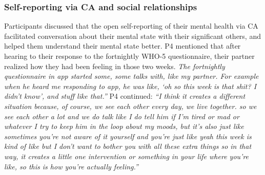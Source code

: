         
        

        
   

            
            
    \subsubsection{Self-reporting via \ac{CA} and social relationships}    
        Participants discussed that the open self-reporting of their mental health via \ac{CA} 
        facilitated conversation about their mental state with their significant others, 
        and helped them understand their mental state better.
        P4 mentioned that after hearing to their response to the fortnightly \ac{WHO-5} questionnaire, their partner realized how they had been feeling in those two weeks.
            \textit{ The fortnightly questionnaire in \acl{app} started some, some talks with, like my partner. For example when he heard me responding to \acl{app}, he was like, `oh so this week is that shit? I didn't know', and stuff like that.''}
        P4 continued:
            \textit{``I think it creates a different situation because, of course, we see each other every day, we live together. 
            so we see each other a lot and we do talk like I do tell him if I'm tired or mad or whatever I try to keep him in the loop about my moods, but it's also just like sometimes you're not aware of it yourself and you're just like yeah this week is kind of like but I don't want to bother you with all these extra things so in that way, it creates a little one intervention or something in your life where you're like, so this is how you're actually feeling.''} 
